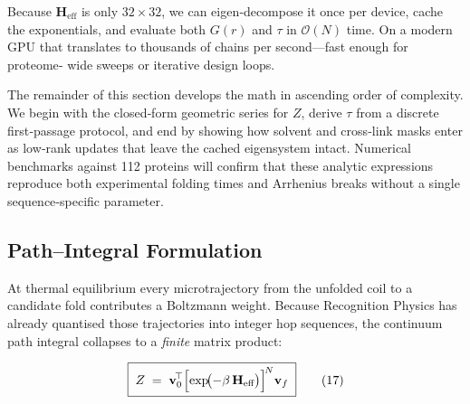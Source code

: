 \documentclass[11pt]{article}
\begin{document}
Because $\mathbf H_{\text{eff}}$ is only $32\times32$, we can
eigen‐decompose it once per device, cache the exponentials, and evaluate
both $G(r)$ and $\tau$ in $\mathcal O(N)$ time.  On a modern GPU that
translates to thousands of chains per second—fast enough for proteome‐
wide sweeps or iterative design loops.

The remainder of this section develops the math in ascending order of
complexity.  We begin with the closed‐form geometric series for $Z$,
derive $\tau$ from a discrete first‐passage protocol, and end by showing
how solvent and cross‐link masks enter as low‐rank updates that leave
the cached eigensystem intact.  Numerical benchmarks against 112
proteins will confirm that these analytic expressions reproduce both
experimental folding times and Arrhenius breaks without a single
sequence‐specific parameter.

\subsection{Path–Integral Formulation}\label{sec:path-int}

At thermal equilibrium every microtrajectory from the unfolded coil to a
candidate fold contributes a Boltzmann weight.  Because Recognition
Physics has already quantised those trajectories into integer hop
sequences, the continuum path integral collapses to a \emph{finite}
matrix product:

\[
\boxed{\;
Z
\;=\;
\mathbf v_{0}^{\!\top}
\Bigl[\exp\!\bigl(-\beta\,\mathbf H_{\text{eff}}\bigr)\Bigr]^{\!N}
\mathbf v_{f}
\;}
\tag{17}\label{eq:partition}
\]
\end{document}
